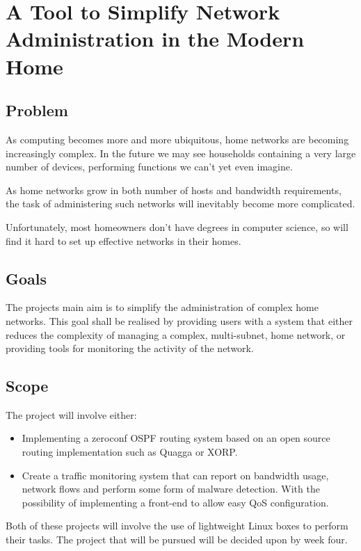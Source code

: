 \section*{A Tool to Simplify Network Administration in the Modern Home}

\subsection*{Problem}

As computing becomes more and more ubiquitous, home networks are becoming increasingly complex. In the future we may see households containing a very large number of devices, performing functions we can't yet even imagine. 

As home networks grow in both number of hosts and bandwidth requirements, the task of administering such networks will inevitably become more complicated. 

Unfortunately, most homeowners don't have degrees in computer science, so will find it hard to set up effective networks in their homes. 

\subsection*{Goals}

The projects main aim is to simplify the administration of complex home networks. This goal shall be realised by providing users with a system that either reduces the complexity of managing a complex, multi-subnet, home network, or providing tools for monitoring the activity of the network. 

\subsection*{Scope}


The project will involve either:
\begin{itemize}
\item Implementing a zeroconf OSPF routing system based on an open source routing implementation such as Quagga or XORP.

\item Create a traffic monitoring system that can report on bandwidth usage, network flows and perform some form of malware detection. With the possibility of implementing a front-end to allow easy QoS configuration. 

\end{itemize}

Both of these projects will involve the use of lightweight Linux boxes to perform their tasks. The project that will be pursued will be decided upon by week four. 


